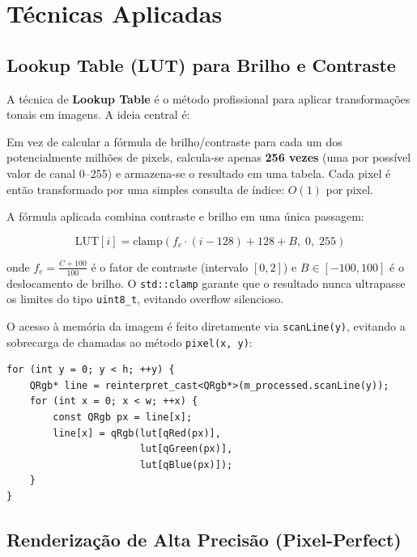 \documentclass[12pt, a4paper]{article}
\begin{document}
\section{Técnicas Aplicadas}

\subsection{Lookup Table (LUT) para Brilho e Contraste}

A técnica de \textbf{Lookup Table} é o método profissional para aplicar
transformações tonais em imagens. A ideia central é:

\begin{infobox}[title={Princípio da LUT}]
  Em vez de calcular a fórmula de brilho/contraste para cada um dos
  potencialmente milhões de pixels, calcula-se apenas \textbf{256 vezes}
  (uma por possível valor de canal 0--255) e armazena-se o resultado em uma
  tabela. Cada pixel é então transformado por uma simples consulta de índice:
  $O(1)$ por pixel.
\end{infobox}

A fórmula aplicada combina contraste e brilho em uma única passagem:

\begin{equation}
  \text{LUT}[i] = \text{clamp}\!\left(
    f_c \cdot (i - 128) + 128 + B,\; 0,\; 255
  \right)
\end{equation}

onde $f_c = \frac{C + 100}{100}$ é o fator de contraste (intervalo $[0, 2]$)
e $B \in [-100, 100]$ é o deslocamento de brilho. O \texttt{std::clamp} garante
que o resultado nunca ultrapasse os limites do tipo \texttt{uint8\_t}, evitando
overflow silencioso.

O acesso à memória da imagem é feito diretamente via \texttt{scanLine(y)},
evitando a sobrecarga de chamadas ao método \texttt{pixel(x, y)}:

\begin{lstlisting}[caption={Aplicação da LUT com acesso direto à memória}]
for (int y = 0; y < h; ++y) {
    QRgb* line = reinterpret_cast<QRgb*>(m_processed.scanLine(y));
    for (int x = 0; x < w; ++x) {
        const QRgb px = line[x];
        line[x] = qRgb(lut[qRed(px)],
                       lut[qGreen(px)],
                       lut[qBlue(px)]);
    }
}
\end{lstlisting}

\subsection{Renderização de Alta Precisão (Pixel-Perfect)}
\end{document}
